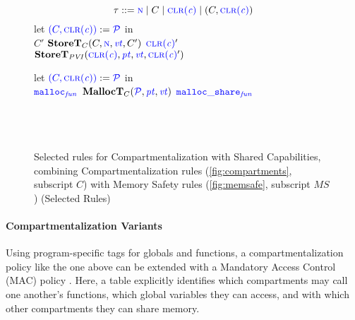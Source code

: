 \documentclass{llncs}
\begin{document}
\begin{figure}[t]
  \color{blue}
  \begin{minipage}{0.5\textwidth}
    \[\tau ::= \N \mid C \mid \clr \mid (C,\clr)\]
    \scriptsize
    \storetruleblock
        {let  \({\color{blue}(C,\clr)} := \PCT\) in \\
          \caseoftwo{\(\lt\)}
                    {\color{blue} \(C'\)}{\color{blue} \(\mathbf{StoreT}_C(C,\N,\vt,C')\)}
                    {\color{blue} \(\clr'\)}{\color{blue} \(\mathbf{StoreT}_{\mathit{PVI}}(\clr,\pt,\vt,\clr')\)}}
  \end{minipage}
  \begin{minipage}{0.5\textwidth}
    \scriptsize
    \malloctruleblock
      {let \({\color{blue} (C,\clr)} := \PCT\) in \\
        \caseoftwo{\(\pt\)}
                  {\(\FN[malloc]\)}{\color{blue} \(\mathbf{MallocT}_{C}(\PCT,\pt,\vt)\)}
                  {\(\FN[malloc\_share]\)}
                  {\\ \\
                     \\
                     \\}
      }
  \end{minipage}
  
  \caption{Selected rules for Compartmentalization with Shared Capabilities, combining Compartmentalization rules (\cref{fig:compartments}, subscript \(C\)) with Memory Safety rules (\cref{fig:memsafe}, subscript \(\mathit{MS}\)) (Selected Rules)}
  \label{fig:sharing}
\end{figure}

\paragraph*{Compartmentalization Variants}

Using program-specific tags for globals and functions, a compartmentalization policy
like the one above can be extended with a Mandatory Access Control (MAC) policy \cite{Lampson74:Protection}.
Here, a table explicitly identifies which compartments may call one another's functions,
which global variables they can access, and with which other compartments they can share
memory.
\end{document}
